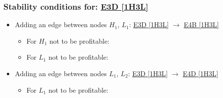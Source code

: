 

\subsubsection{Stability conditions for: \hyperref[apx:E3D:1H3L]{E3D [1H3L]}}
\label{apx:E3D:1H3L_stability_cond}

\begin{itemize}

	\item Adding an edge between nodes $H_1$, $L_1$: \hyperref[apx:E3D:1H3L]{E3D [1H3L]} $\to$ \hyperref[apx:E4B:1H3L]{E4B [1H3L]}

	\begin{itemize}

		\item For $H_1$ not to be profitable:


		\item For $L_1$ not to be profitable:


	\end{itemize}

	\item Adding an edge between nodes $L_1$, $L_2$: \hyperref[apx:E3D:1H3L]{E3D [1H3L]} $\to$ \hyperref[apx:E4D:1H3L]{E4D [1H3L]}

	\begin{itemize}

		\item For $L_1$ not to be profitable:


\end{itemize}
\end{itemize}
